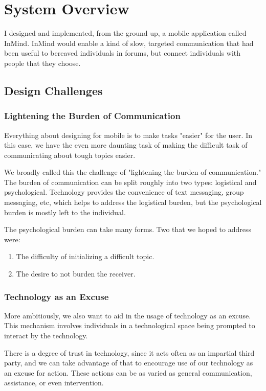 \chapter{System Overview}
  I designed and implemented,
  from the ground up, a mobile application called InMind.
  InMind would enable a kind of slow,
  targeted communication that had been useful to bereaved individuals in forums,
  but connect individuals with people that they choose.

  \section{Design Challenges}
    \subsection{Lightening the Burden of Communication}
    Everything about designing for mobile is to make tasks "easier" for the user.
    In this case, we have the even more daunting task of making
    the difficult task of communicating about tough topics easier.

    We broadly called this the challenge of "lightening the burden of communication."
    The burden of communication can be split roughly into two types:
    logistical and psychological.
    Technology provides the convenience of text messaging,
    group messaging, etc, which helps to address the logistical burden,
    but the psychological burden is mostly left to the individual.

    The psychological burden can take many forms.
    Two that we hoped to address were:
    \begin{enumerate}
    \item The difficulty of initializing a difficult topic.
    \item The desire to not burden the receiver.
    \end{enumerate}

    \subsection{Technology as an Excuse}
    More ambitiously, we also want to aid in the usage of technology as an excuse.
    This mechanism involves individuals in a technological space being prompted
    to interact by the technology.
    
    There is a degree of trust in technology, since it acts often as an impartial third party,
    and we can take advantage of that to encourage use of our technology as an excuse for action.
    These actions can be as varied as 
    general communication,
    assistance, or even intervention.

